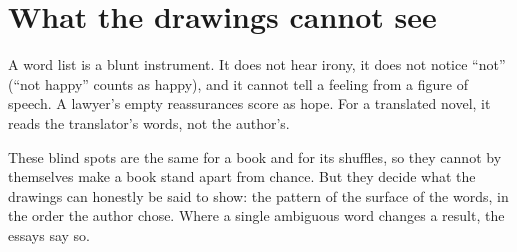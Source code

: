 \section{What the drawings cannot see}

A word list is a blunt instrument. It does not hear irony, it does not notice
``not'' (``not happy'' counts as happy), and it cannot tell a feeling from a
figure of speech. A lawyer's empty reassurances score as hope. For a translated
novel, it reads the translator's words, not the author's.

These blind spots are the same for a book and for its shuffles, so they cannot
by themselves make a book stand apart from chance. But they decide what the
drawings can honestly be said to show: the pattern of the surface of the words,
in the order the author chose. Where a single ambiguous word changes a result,
the essays say so.

